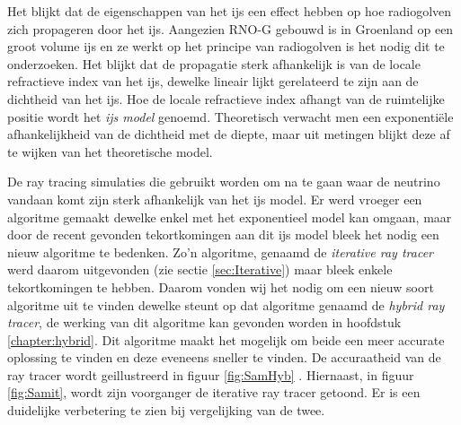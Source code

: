 Het blijkt dat de eigenschappen van het ijs een effect hebben op hoe radiogolven zich propageren door het ijs.
Aangezien RNO-G gebouwd is in Groenland op een groot volume ijs en ze werkt op het principe van radiogolven
is het nodig dit te onderzoeken. Het blijkt dat de propagatie sterk afhankelijk is van de locale refractieve
index van het ijs, dewelke lineair lijkt gerelateerd te zijn aan de dichtheid van het ijs. Hoe de locale
refractieve index afhangt van de ruimtelijke positie wordt het \textit{ijs model} genoemd. Theoretisch
verwacht men een exponentiële afhankelijkheid van de dichtheid met de diepte, maar uit metingen blijkt deze
af te wijken van het theoretische model. 

De ray tracing simulaties die gebruikt worden om na te gaan waar de neutrino
vandaan komt zijn sterk afhankelijk van het ijs model.  Er werd vroeger een
algoritme gemaakt dewelke enkel met het exponentieel model kan omgaan, maar
door de recent gevonden tekortkomingen aan dit ijs model bleek het nodig een
nieuw algoritme te bedenken. Zo'n algoritme, genaamd de \textit{iterative ray
tracer} werd daarom uitgevonden (zie sectie \ref{sec:Iterative}) maar bleek
enkele tekortkomingen te hebben. Daarom vonden wij het nodig om een nieuw soort
algoritme uit te vinden dewelke steunt op dat algoritme genaamd de
\textit{hybrid ray tracer}, de werking van dit algoritme kan gevonden worden in
hoofdstuk \ref{chapter:hybrid}. Dit algoritme maakt het mogelijk om beide een
meer accurate oplossing te vinden en deze eveneens sneller te vinden.
De accuraatheid van de ray tracer wordt geillustreerd in figuur \ref{fig:SamHyb}
. Hiernaast, in figuur \ref{fig:Samit}, wordt zijn voorganger de iterative ray tracer
getoond. Er is een duidelijke verbetering te zien bij vergelijking van de twee.
